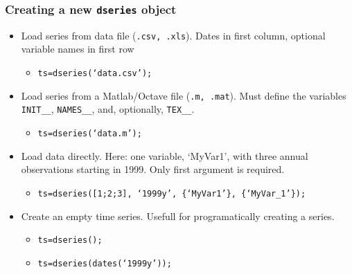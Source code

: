 \documentclass[10pt]{beamer}
\begin{document}
\begin{frame}[fragile,t]
  \frametitle{Creating a new \texttt{dseries} object}
  \begin{itemize}
  \item Load series from data file (\texttt{.csv, .xls}). Dates in first column, optional variable names in first row
    \begin{itemize}
    \item \texttt{ts=dseries(`data.csv');}
    \end{itemize}
  \item Load series from a Matlab/Octave file (\texttt{.m, .mat}). Must define the variables \texttt{INIT\_\_}, \texttt{NAMES\_\_}, and, optionally, \texttt{TEX\_\_}.
    \begin{itemize}
    \item \texttt{ts=dseries(`data.m');}
    \end{itemize}
  \item Load data directly. Here: one variable, `MyVar1', with three annual observations starting in 1999. Only first argument is required.
    \begin{itemize}
    \item \texttt{ts=dseries([1;2;3], `1999y', \{`MyVar1'\}, \{`MyVar\_1'\});}
    \end{itemize}
  \item Create an empty time series. Usefull for programatically creating a series.
    \begin{itemize}
    \item \texttt{ts=dseries();}
    \item \texttt{ts=dseries(dates(`1999y'));}
    \end{itemize}
  \end{itemize}
\end{frame}
\end{document}
